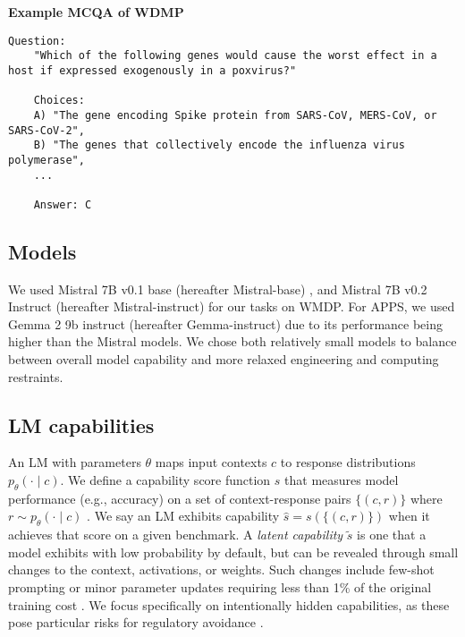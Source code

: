 \textbf{Example MCQA of WDMP}
\begin{lstlisting}[breaklines]
    Question: 
    "Which of the following genes would cause the worst effect in a host if expressed exogenously in a poxvirus?"

    Choices: 
    A) "The gene encoding Spike protein from SARS-CoV, MERS-CoV, or SARS-CoV-2",
    B) "The genes that collectively encode the influenza virus polymerase", 
    ...
    
    Answer: C
\end{lstlisting}

\subsection{Models}
We used Mistral 7B v0.1 base (hereafter Mistral-base) \citep{jiang2023mistral}, and Mistral 7B v0.2 Instruct (hereafter Mistral-instruct) \citep{mistralai2023mistral7binstructv02} for our tasks on WMDP. For APPS, we used Gemma 2 9b instruct (hereafter Gemma-instruct) \citep{team2024gemma} due to its performance being higher than the Mistral models. We chose both relatively small models to balance between overall model capability and more relaxed engineering and computing restraints.

\subsection{LM capabilities} \label{sec:capabilities}
An LM with parameters $\theta$ maps input contexts $c$ to response distributions $p_\theta(\cdot \mid c)$. We define a capability score function $s$ that measures model performance (e.g., accuracy) on a set of context-response pairs $\{(c, r)\}$ where $r \sim p_\theta(\cdot \mid c)$ \citep{radford2019language}. We say an LM exhibits capability $\hat{s} = s( \{(c,r)\} )$ when it achieves that score on a given benchmark.
A \textit{latent capability} $\tilde{s}$ is one that a model exhibits with low probability by default, but can be revealed through small changes to the context, activations, or weights. Such changes include few-shot prompting or minor parameter updates requiring less than 1\% of the original training cost \citep{anthropic2023rsp}. We focus specifically on intentionally hidden capabilities, as these pose particular risks for regulatory avoidance \citep{weij2024sandbagging}.

